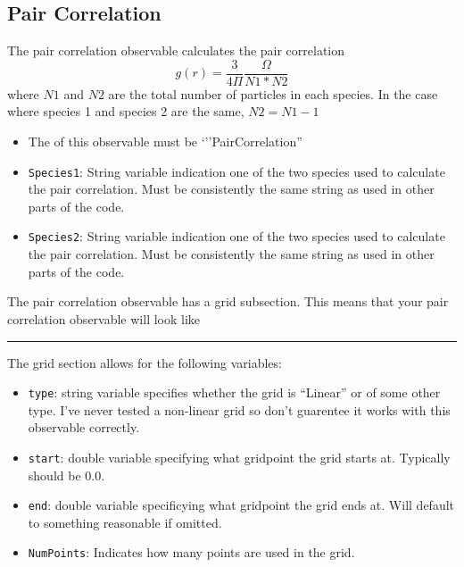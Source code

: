 \documentclass{book}
\begin{document}
\subsection{Pair Correlation}
The pair correlation observable calculates the pair correlation   
$$g(r)=\frac{3}{4\Pi}\frac{\Omega}{N1*N2}$$ where $N1$ and $N2$ are
the total number of particles in each species. In the case where
species 1 and species 2 are the same, $N2=N1-1$ 
\begin{itemize}
\item The  of this observable must be
`''PairCorrelation''
\item \texttt{Species1}: String variable indication one of the two species used to calculate the
  pair correlation. Must be consistently the same string as used in
  other parts of the code.
\item \texttt{Species2}: String variable indication one of the two species used to calculate the
  pair correlation. Must be consistently the same string as used in
  other parts of the code.
\end{itemize}
The pair correlation observable has a grid subsection. This means that
your pair correlation observable will look like
\rule{0.6cm}{0cm}
The grid section allows for the following variables:
\begin{itemize}
\item \texttt{type}: string variable specifies whether the grid is
  ``Linear'' or of some other type. I've never tested a non-linear
  grid so don't guarentee it works with this observable correctly.
\item \texttt{start}: double variable specifying what gridpoint the grid
  starts at. Typically should be 0.0.
\item \texttt{end}: double variable specificying what gridpoint the
  grid ends at. Will default to something reasonable if omitted.
\item \texttt{NumPoints}: Indicates how many points are used in the grid.
\end{itemize}
\end{document}
